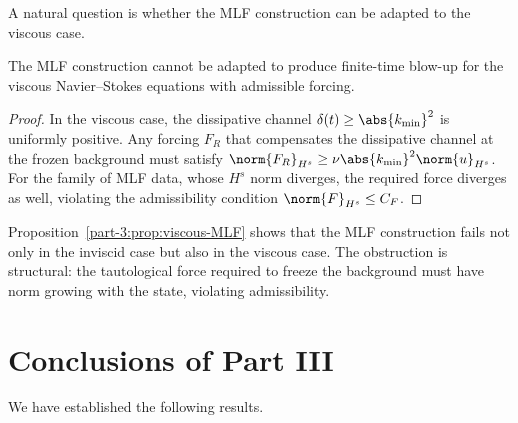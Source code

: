 A natural question is whether the MLF construction can be adapted to 
the viscous case.

\begin{proposition}\label{part-3:prop:viscous-MLF}
The MLF construction cannot be adapted to produce finite-time 
blow-up for the viscous Navier--Stokes equations with admissible 
forcing.
\end{proposition}

\begin{proof}
In the viscous case, the dissipative channel $\delta(t)\geq 
\abs{k_{\min}}^2$ is uniformly positive. Any forcing $F_R$ that 
compensates the dissipative channel at the frozen background must 
satisfy $\norm{F_R}_{H^s}\geq \nu\abs{k_{\min}}^2\norm{u}_{H^s}$. For 
the family of MLF data, whose $H^s$ norm diverges, the required 
force diverges as well, violating the admissibility condition 
$\norm{F}_{H^s}\leq C_F$.
\end{proof}

\begin{remark}\label{part-3:rem:complete-obstr}
Proposition~\ref{part-3:prop:viscous-MLF} shows that the MLF construction 
fails not only in the inviscid case but also in the viscous case. 
The obstruction is structural: the tautological force required to 
freeze the background must have norm growing with the state, 
violating admissibility.
\end{remark}

\section{Conclusions of Part III}
\label{part-3:sec:conclusions}

We have established the following results.

